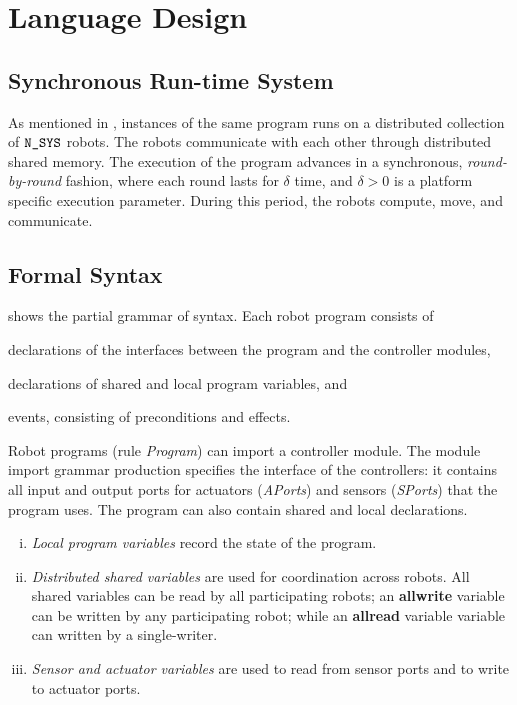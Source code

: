 \section{\lgname Language Design}
\label{sec:language}

\subsection{Synchronous Run-time System }

As mentioned in , instances of the same \lgname program runs on a distributed collection of $\texttt{N\_SYS}$ robots. The robots communicate with each other through distributed shared memory.
%
%
The execution of the \lgname program advances in a synchronous, \emph{round-by-round} fashion, where each round lasts for $\delta$ time, and $\delta >0$ is a platform specific execution parameter. During this period, the robots compute, move, and communicate.


\subsection{Formal Syntax}\label{sec:syntax}

 shows the partial grammar of \lgname syntax.
Each robot program consists of
\begin{inparaenum}[(a)]
\item declarations of the interfaces between the program and the controller modules,
\item declarations of shared and local program variables, and
\item events, consisting of preconditions and effects.
\end{inparaenum}
Robot programs (rule \emph{Program}) can import a controller module.
%
%
The module import grammar production specifies the interface of the controllers:
it contains all input and output ports for actuators (\emph{APorts}) and sensors (\emph{SPorts}) that the program uses.
The program can also contain shared and local declarations.

\begin{enumerate}[(i)]
\item \emph{Local program variables} record the state of the program.
\item \emph{Distributed shared variables} are used for coordination across robots. All shared variables can be read by all participating robots; an
      \textbf{allwrite} variable can be written by any participating robot; while an 
      \textbf{allread} variable variable can written by a single-writer.
\item \emph{Sensor and actuator variables} are used to read from sensor ports and to write to actuator ports.
\end{enumerate}
%
%

